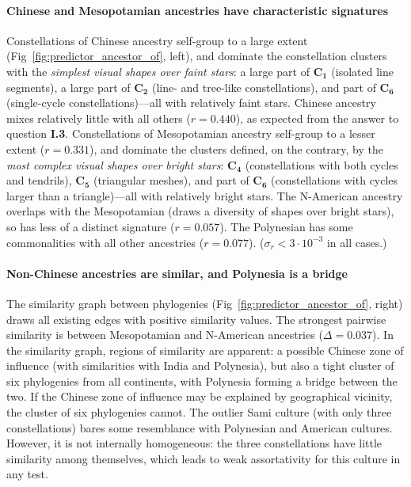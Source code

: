 \documentclass[10pt]{article}
\begin{document}
\paragraph{Chinese and Mesopotamian ancestries have characteristic signatures} Constellations of Chinese ancestry self-group to a large extent (Fig~\ref{fig:predictor_ancestor_of}, left), and dominate the constellation clusters with the \emph{simplest visual shapes over faint stars}: a large part of $\mathbf{C_1}$ (isolated line segments), a large part of $\mathbf{C_2}$ (line- and tree-like constellations), and part of $\mathbf{C_6}$ (single-cycle constellations)---all with relatively faint stars. Chinese ancestry mixes relatively little with all others ($r=0.440$), as expected from the answer to question {\bf I.3}. Constellations of Mesopotamian ancestry self-group to a lesser extent ($r=0.331$), and dominate the clusters defined, on the contrary, by the \emph{most complex visual shapes over bright stars}: $\mathbf{C_4}$ (constellations with both cycles and tendrils), $\mathbf{C_5}$ (triangular meshes), and part of $\mathbf{C_6}$ (constellations with cycles larger than a triangle)---all with relatively bright stars. The N-American ancestry overlaps with the Mesopotamian (draws a diversity of shapes over bright stars), so has less of a distinct signature ($r=0.057$). The Polynesian has some commonalities with all other ancestries ($r=0.077$). ($\sigma_r < 3\cdot 10^{-3}$ in all cases.)

\paragraph{Non-Chinese ancestries are similar, and Polynesia is a bridge} The similarity graph between phylogenies (Fig~\ref{fig:predictor_ancestor_of}, right) draws all existing edges with positive similarity values. The strongest pairwise similarity is between Mesopotamian and N-American ancestries ($\Delta=0.037$). In the similarity graph, regions of similarity are apparent: a possible Chinese zone of influence (with similarities with India and Polynesia), but also a tight cluster of six phylogenies from all continents, with Polynesia forming a bridge between the two. If the Chinese zone of influence may be explained by geographical vicinity, the cluster of six phylogenies cannot. The outlier Sami culture (with only three constellations) bares some resemblance with Polynesian and American cultures. However, it is not internally homogeneous: the three constellations have little similarity among themselves, which leads to weak assortativity for this culture in any test.
\end{document}
